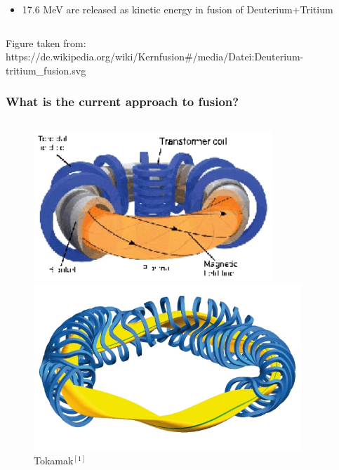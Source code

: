 \documentclass{beamer}
\begin{document}
\begin{frame}
\begin{columns}[onlytextwidth]
\begin{column}{0.45\textwidth}
\begin{center}
\begin{itemize}
					\item 17.6 MeV are released as kinetic energy in fusion of Deuterium+Tritium\\
				\end{itemize}
			\end{center}
		\end{column}
	\end{columns}
\vspace{0.3cm}
\begin{footnotesize}
				{\tiny Figure taken from: https://de.wikipedia.org/wiki/Kernfusion\#/media/Datei:Deuterium-tritium\_fusion.svg}
\end{footnotesize}
\end{frame}




\begin{frame}
\frametitle{What is the current approach to fusion?}
\vspace{-1.8 cm}
\begin{columns}[onlytextwidth]
	\begin{column}{0.45\textwidth}
		\begin{center}
		\begin{figure}
			\includegraphics[trim={0 0 0 0cm},clip,width=0.8\textwidth]{FIGURES/Schematic-of-a-Tokamak-fusion-reactor-Source-Fusion-for-energy.eps}
	\vspace{-0.2cm}	\caption{Tokamak$^{[1]}$}
					\includegraphics[trim={0 0 0 0cm},clip,width=0.9\textwidth]{FIGURES/W7X-Spulen_Plasma_blau_gelb.jpg}

\end{figure}
\end{center}
\end{column}
\end{columns}
\end{frame}
\end{document}
